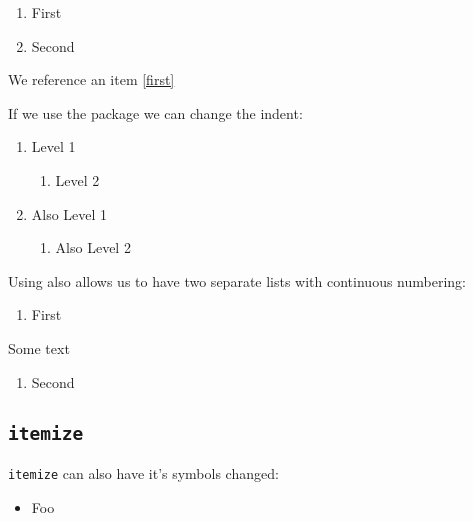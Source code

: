 \begin{example}
\renewcommand{\theenumi}{Point \Alph{enumi}}
\renewcommand{\labelenumi}{I \Alph{enumi}}
\begin{enumerate}
\item First\label{first}
\item Second
\end{enumerate}
We reference an item \ref{first}
\end{example}

If we use the package  we can change the indent:

\begin{example}
\begin{enumerate}
\item Level 1
  \begin{enumerate}[leftmargin=0cm]
    \item Level 2
    \end{enumerate}
\item Also Level 1
  \begin{enumerate}
    \item Also Level 2
  \end{enumerate}
\end{enumerate}
\end{example}

Using  also allows us to have two separate lists with continuous
numbering:\\
\begin{example}
\begin{enumerate}
\item First
\end{enumerate}
Some text
\begin{enumerate}[resume]
\item Second
\end{enumerate}
\end{example}

\subsection{\texttt{itemize}}
\texttt{itemize} can also have it's symbols changed:\\
\begin{example}
  \renewcommand{\labelitemi}{$\bigstar$}
  \renewcommand{\labelitemii}{$\checkmark$}
  \renewcommand{\labelitemiii}{$\sharp$}
  \renewcommand{\labelitemiv}{$\maltese$}
  \begin{itemize}
    \item Foo
\end{itemize}
\end{example}

